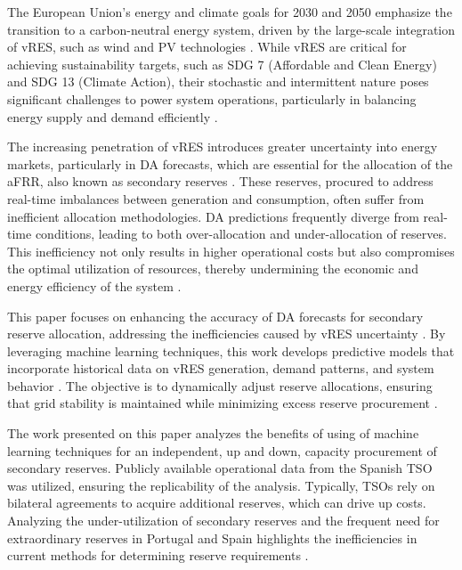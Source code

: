 The European Union's energy and climate goals for 2030 and 2050 emphasize the transition to a carbon-neutral energy system, driven by the large-scale integration of \gls{vRES}, such as wind and \gls{PV} technologies \cite{Franc:21,Perissi2022,Dobrowolski:22}. While \gls{vRES} are critical for achieving sustainability targets, such as \gls{SDG} 7 (Affordable and Clean Energy) and \gls{SDG} 13 (Climate Action), their stochastic and intermittent nature poses significant challenges to power system operations, particularly in balancing energy supply and demand efficiently \cite{Ocker2017,Frade2019_wind}.  \par
The increasing penetration of \gls{vRES} introduces greater uncertainty into energy markets, particularly in \gls{DA} forecasts, which are essential for the allocation of the \gls{aFRR}, also known as secondary reserves \cite{Algarvio:19c,Skytte:19}. These reserves, procured to address real-time imbalances between generation and consumption, often suffer from inefficient allocation methodologies. \gls{DA} predictions frequently diverge from real-time conditions, leading to both over-allocation and under-allocation of reserves. This inefficiency not only results in higher operational costs but also compromises the optimal utilization of resources, thereby undermining the economic and energy efficiency of the system \cite{Algarvio:24,Frade:19c}.\par
This paper focuses on enhancing the accuracy of \gls{DA} forecasts for secondary reserve allocation, addressing the inefficiencies caused by \gls{vRES} uncertainty \cite{Algarvio:19b,Knorr:19}. By leveraging machine learning techniques, this work develops predictive models that incorporate historical data on \gls{vRES} generation, demand patterns, and system behavior \cite{DeVos2019,Kruse2022} . The objective is to dynamically adjust reserve allocations, ensuring that grid stability is maintained while minimizing excess reserve procurement \cite{Algarvio:24,Algarvio2024}.\par
The work presented on this paper analyzes the benefits of using of machine learning techniques for an independent, up and down, capacity procurement of secondary reserves. Publicly available operational data from the Spanish \gls{TSO} was utilized, ensuring the replicability of the analysis. Typically, \gls{TSO}s rely on bilateral agreements to acquire additional reserves, which can drive up costs. Analyzing the under-utilization of secondary reserves and the frequent need for extraordinary reserves in Portugal and Spain highlights the inefficiencies in current methods for determining reserve requirements \cite{Frade:19c,Algarvio2024,Algarvio:24,Martin:18}. \par
